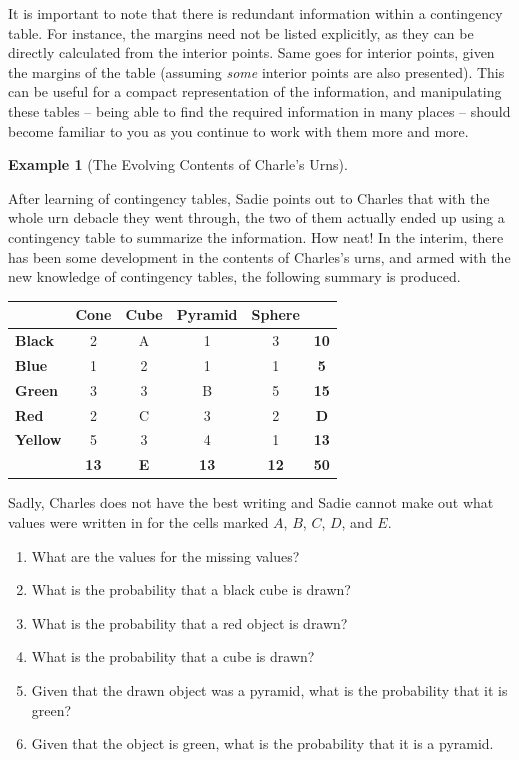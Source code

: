 \documentclass[
  letterpaper,
  DIV=11,
  numbers=noendperiod]{scrreprt}
\providecommand{\tightlist}{%
  \setlength{\itemsep}{0pt}\setlength{\parskip}{0pt}}\usepackage{longtable,booktabs,array}
\theoremstyle{definition}
\theoremstyle{definition}
\newtheorem{example}{Example}[chapter]
\theoremstyle{definition}
\theoremstyle{remark}
\begin{document}
It is important to note that there is redundant information within a
contingency table. For instance, the margins need not be listed
explicitly, as they can be directly calculated from the interior points.
Same goes for interior points, given the margins of the table (assuming
\emph{some} interior points are also presented). This can be useful for
a compact representation of the information, and manipulating these
tables -- being able to find the required information in many places --
should become familiar to you as you continue to work with them more and
more.

\begin{example}[The Evolving Contents of Charle's
Urns]\protect\hypertarget{exm-charles-contingency-table}{}\label{exm-charles-contingency-table}

After learning of contingency tables, Sadie points out to Charles that
with the whole urn debacle they went through, the two of them actually
ended up using a contingency table to summarize the information. How
neat! In the interim, there has been some development in the contents of
Charles's urns, and armed with the new knowledge of contingency tables,
the following summary is produced.

\begin{tabular}{>{}l|c|c|c|c|>{}c}
\hline
  & Cone & Cube & Pyramid & Sphere & \\
\hline
\textbf{Black} & 2 & A & 1 & 3 & \textbf{10}\\
\hline
\textbf{Blue} & 1 & 2 & 1 & 1 & \textbf{5}\\
\hline
\textbf{Green} & 3 & 3 & B & 5 & \textbf{15}\\
\hline
\textbf{Red} & 2 & C & 3 & 2 & \textbf{D}\\
\hline
\textbf{Yellow} & 5 & 3 & 4 & 1 & \textbf{13}\\
\hline
\textbf{\textbf{}} & \textbf{13} & \textbf{E} & \textbf{13} & \textbf{12} & \textbf{\textbf{50}}\\
\hline
\end{tabular}

Sadly, Charles does not have the best writing and Sadie cannot make out
what values were written in for the cells marked \(A\), \(B\), \(C\),
\(D\), and \(E\).

\begin{enumerate}
\def\labelenumi{\alph{enumi}.}
\tightlist
\item
  What are the values for the missing values?
\item
  What is the probability that a black cube is drawn?
\item
  What is the probability that a red object is drawn?
\item
  What is the probability that a cube is drawn?
\item
  Given that the drawn object was a pyramid, what is the probability
  that it is green?
\item
  Given that the object is green, what is the probability that it is a
  pyramid.
\end{enumerate}


\end{example}
\end{document}
